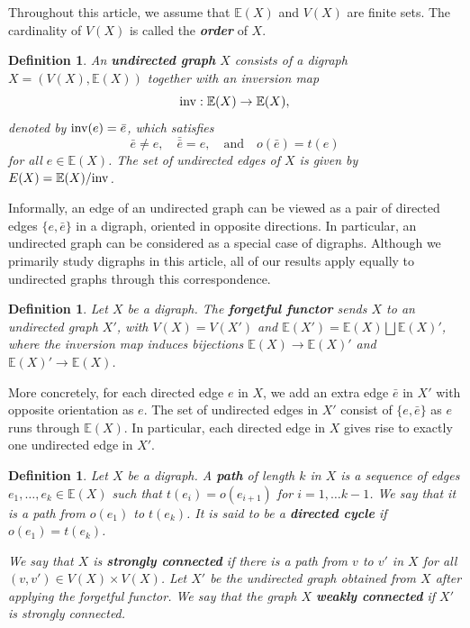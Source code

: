 \documentclass[11pt]{amsart}
\newtheorem{defn}[theorem]{Definition}
\numberwithin{equation}{section}
\theoremstyle{remark}
\newcommand{\EE}{\mathbb{E}}
\newcommand{\?}{\stackrel{?}{=}}
\begin{document}
Throughout this article, we assume that $\EE(X)$ and $V(X)$ are finite sets. The cardinality of $V(X)$ is called the \textbf{\textit{order}} of $X$.

\begin{defn}
An \textbf{undirected graph} $X$ consists of a digraph $X = (V(X),\EE(X))$ together with an inversion map
$${\rm inv}:\EE(X) \rightarrow \EE(X) ,$$
denoted by ${\rm inv}(e) = \bar{e}$, which satisfies
$$\bar{e} \neq e,\quad \bar{\bar{e}} = e, \quad\text{and}\quad o(\bar{e}) = t(e) $$
for all $e \in \EE(X)$.  The set of undirected edges of $X$ is given by $E(X) = \EE(X)/{\rm inv}$. 
\end{defn}

Informally, an edge of an undirected graph can be viewed as a pair of directed edges $\{e, \bar e\}$ in a digraph, oriented in opposite directions. In particular, an undirected graph can be considered as a special case of digraphs. Although we primarily study digraphs in this article, all of our results apply equally to undirected graphs through this correspondence.

\begin{defn}
  Let $X$ be a digraph. The \textbf{forgetful functor} sends $X$ to an undirected graph $X'$, with $V(X)=V(X')$ and  $\EE(X')=\EE(X)\bigsqcup\EE(X)'$, where the inversion map induces bijections $\EE(X)\to\EE(X)'$ and $\EE(X)'\to\EE(X)$.
\end{defn}

More concretely, for each directed edge $e$ in $X$, we add an extra edge $\bar e$ in $X'$ with opposite orientation as $e$. The set of undirected edges in $X'$ consist of $\{e,\bar e\}$ as $e$ runs through $\EE(X)$. In particular, each directed edge in $X$ gives rise to exactly one undirected edge in $X'$.



\begin{defn}
    Let $X$ be a digraph. A \textbf{path} of length $k$ in $X$ is a sequence of edges $e_1,\dots, e_k\in\EE(X)$  such that $t(e_i)=o(e_{i+1})$ for $i=1,\dots k-1$. We say that it is a path from $o(e_1)$ to $t(e_k)$. It is said to be a \textbf{directed cycle} if $o(e_1)=t(e_k)$.
    
    
    We say that $X$ is \textbf{strongly connected} if there is a path from $v$ to $v'$ in $X$ for all  $(v,v')\in V(X)\times V(X)$.  Let $X'$ be the undirected graph obtained from $X$ after applying the forgetful functor.  We say that the graph $X$ \textbf{weakly connected} if $X'$ is strongly connected.
\end{defn}
\end{document}
